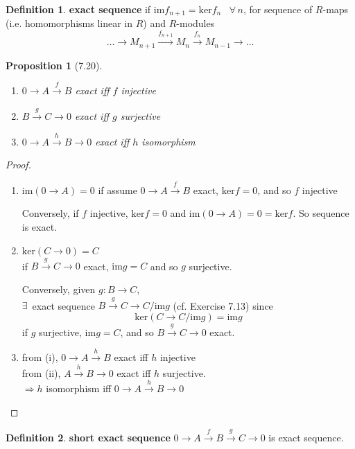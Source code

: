 \documentclass[twoside,landscape]{amsart}
\theoremstyle{plain}
\newtheorem{proposition}{Proposition}
\theoremstyle{definition}
\newtheorem{definition}{Definition}
\theoremstyle{remark}
\begin{document}
\begin{multicols*}{2}
\begin{definition}
  \textbf{exact sequence} if $\text{im}f_{n+1} = \text{ker}f_n$ \, $\forall \, n$, for sequence of $R$-maps (i.e. homomorphisms linear in $R$) and $R$-modules 
\[
\dots \to M_{n+1} \xrightarrow{ f_{n+1}} M_n \xrightarrow{ f_n} M_{n-1} \to \dots
\]
\end{definition}

\begin{proposition}[7.20]
  \begin{enumerate}
    \item[(i)] $0 \to A \xrightarrow{f} B$ exact iff $f$ injective 
    \item[(ii)] $B \xrightarrow{g} C \to 0$ exact iff $g$ surjective 
    \item[(iii)] $0 \to A \xrightarrow{h} B \to 0$ exact iff $h$ isomorphism
\end{enumerate}
\end{proposition}

\begin{proof}
  \begin{enumerate}
    \item[(i)] $\text{im}(0\to A) =0$ 
if assume $0 \to A \xrightarrow{f} B$ exact, $\text{ker}{f} =0$, and so $f$ injective

Conversely, if $f$ injective, $\text{ker}f=0$ and $\text{im}(0\to A)=0 = \text{ker}f$.  So sequence is exact.  
    \item[(ii)] $\text{ker}(C\to 0) = C$ \\
if $B\xrightarrow{g} C \to 0$ exact, $\text{im}g = C$ and so $g$ surjective.  

Conversely, given $g: B \to C$, \\
\phantom{Conversely} $\exists \, $ exact sequence $B \xrightarrow{g} C \to C/\text{im}g$ (cf. Exercise 7.13) since
\[
\text{ker}(C\to C/\text{im}g) = \text{im}g
\]
if $g$ surjective, $\text{im}g =C$, and so $B\xrightarrow{g}C \to 0$ exact.
    \item[(iii)] from (i), $0 \to A \xrightarrow{h} B$ exact iff $h$ injective \\
from (ii), $A \xrightarrow{h} B \to 0$ exact iff $h$ surjective.  \\
$\Longrightarrow  h$ isomorphism iff $0 \to A \xrightarrow{h} B \to 0$
\end{enumerate}
\end{proof}

\begin{definition}
  \textbf{short exact sequence } $0 \to A \xrightarrow{f} B \xrightarrow{g} C \to 0$ is exact sequence. 
\end{definition}


\end{multicols*}
\end{document}
